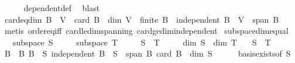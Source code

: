 \begin{isabellebody}
\ \ \ \ \isamarkupfalse%
\ dependent{\isacharunderscore}{\kern0pt}def\ \isamarkupfalse%
\ blast\isanewline
{}\isamarkupfalse%
%
\endisatagproof
{\isafoldproof}%
%
\isadelimproof
\isanewline
%
\endisadelimproof
\isanewline
{}\isamarkupfalse%
\ card{\isacharunderscore}{\kern0pt}eq{\isacharunderscore}{\kern0pt}dim{\isacharcolon}{\kern0pt}\ {\isachardoublequoteopen}B\ {\isasymsubseteq}\ V\ {\isasymLongrightarrow}\ card\ B\ {\isacharequal}{\kern0pt}\ dim\ V\ {\isasymLongrightarrow}\ finite\ B\ {\isasymLongrightarrow}\ independent\ B\ {\isasymlongleftrightarrow}\ V\ {\isasymsubseteq}\ span\ B{\isachardoublequoteclose}\isanewline
%
\isadelimproof
\ \ %
\endisadelimproof
%
\isatagproof
{}\isamarkupfalse%
\ {\isacharparenleft}{\kern0pt}metis\ order{\isacharunderscore}{\kern0pt}eq{\isacharunderscore}{\kern0pt}iff\ card{\isacharunderscore}{\kern0pt}le{\isacharunderscore}{\kern0pt}dim{\isacharunderscore}{\kern0pt}spanning\ card{\isacharunderscore}{\kern0pt}ge{\isacharunderscore}{\kern0pt}dim{\isacharunderscore}{\kern0pt}independent{\isacharparenright}{\kern0pt}%
\endisatagproof
{\isafoldproof}%
%
\isadelimproof
\isanewline
%
\endisadelimproof
\isanewline
{}\isamarkupfalse%
\ subspace{\isacharunderscore}{\kern0pt}dim{\isacharunderscore}{\kern0pt}equal{\isacharcolon}{\kern0pt}\isanewline
\ \ \ {\isachardoublequoteopen}subspace\ S{\isachardoublequoteclose}\isanewline
\ \ \ \ \ {\isachardoublequoteopen}subspace\ T{\isachardoublequoteclose}\isanewline
\ \ \ \ \ {\isachardoublequoteopen}S\ {\isasymsubseteq}\ T{\isachardoublequoteclose}\isanewline
\ \ \ \ \ {\isachardoublequoteopen}dim\ S\ {\isasymge}\ dim\ T{\isachardoublequoteclose}\isanewline
\ \ \ {\isachardoublequoteopen}S\ {\isacharequal}{\kern0pt}\ T{\isachardoublequoteclose}\isanewline
%
\isadelimproof
%
\endisadelimproof
%
\isatagproof
{}\isamarkupfalse%
\ {\isacharminus}{\kern0pt}\isanewline
\ \ \isamarkupfalse%
\ B\ \ B{\isacharcolon}{\kern0pt}\ {\isachardoublequoteopen}B\ {\isasymle}\ S{\isachardoublequoteclose}\ {\isachardoublequoteopen}independent\ B\ {\isasymand}\ S\ {\isasymsubseteq}\ span\ B{\isachardoublequoteclose}\ {\isachardoublequoteopen}card\ B\ {\isacharequal}{\kern0pt}\ dim\ S{\isachardoublequoteclose}\isanewline
\ \ \ \ \isamarkupfalse%
\ basis{\isacharunderscore}{\kern0pt}exists{\isacharbrackleft}{\kern0pt}of\ S{\isacharbrackright}{\kern0pt}\ \isamarkupfalse%

\end{isabellebody}
